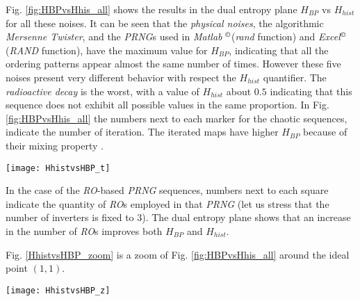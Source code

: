 Fig. \ref{fig:HBPvsHhis_all} shows the results in the dual entropy plane $H_{BP}$ vs $H_{hist}$ for all these noises.
It can be seen that the \emph{physical noises}, the algorithmic \emph{Mersenne Twister}, and the \emph{PRNG}s used in \emph{Matlab} $^\copyright$(\emph{rand} function) and \emph{Excel}$^\copyright$ (\emph{RAND} function), have the  maximum value for $H_{BP}$, indicating that all the ordering patterns appear almost the same number of times. However these five noises present very different behavior with respect the $H_{hist}$ quantifier. The \emph{radioactive decay} is the worst, with a value of $H_{hist}$ about $0.5$ indicating that this sequence does not exhibit all possible values in the same proportion. In Fig. \ref{fig:HBPvsHhis_all} the numbers next to each marker for the chaotic sequences, indicate the number of iteration. The iterated maps have higher $H_{BP}$ because of their mixing property \cite{DeMicco2008}.


\begin{figure*}
\begin{center}
\texttt{[image: HhistvsHBP\_t]}
\caption{$H_{BP}$ vs $H_{hist}$ plane for several noises, numbers next to each square indicate the quantity of \emph{RO}s
used in the \emph{RO} based \emph{PRNG}. Numbers next to each point in the  chaotic sequences labeled \emph{Logistic}
and \emph{TWBM} indicate the number of iteration of the chaotic map (see the text for details).}
\label{fig:HBPvsHhis_all}
\end{center}
\end{figure*}

In the case of the \emph{RO}-based \emph{PRNG} sequences, numbers next to each square indicate the quantity of \emph{RO}s employed in that \emph{PRNG} (let us stress that the number of inverters is fixed to $3$). The dual entropy plane shows that  an increase in the number of \emph{RO}s improves both $H_{BP}$ and $H_{hist}$.

Fig. \ref{HhistvsHBP_zoom} is a zoom of Fig. \ref{fig:HBPvsHhis_all}  around the ideal point $(1,1)$.


\begin{figure*}
\begin{center}
\texttt{[image: HhistvsHBP\_z]}
\caption{Zoom of Fig. \ref{fig:HBPvsHhis_all}  around the ideal point $(1,1)$ of the $H_{BP}$ vs $H_{hist}$ plane. Numbers next to each square indicate the number of \emph{RO}s used in that rings-based \emph{PRNG}. Numbers next to each point in the chaotic sequences indicate the number of iteration of the chaotic map.} \label{HhistvsHBP_zoom}
\end{center}
\end{figure*}

